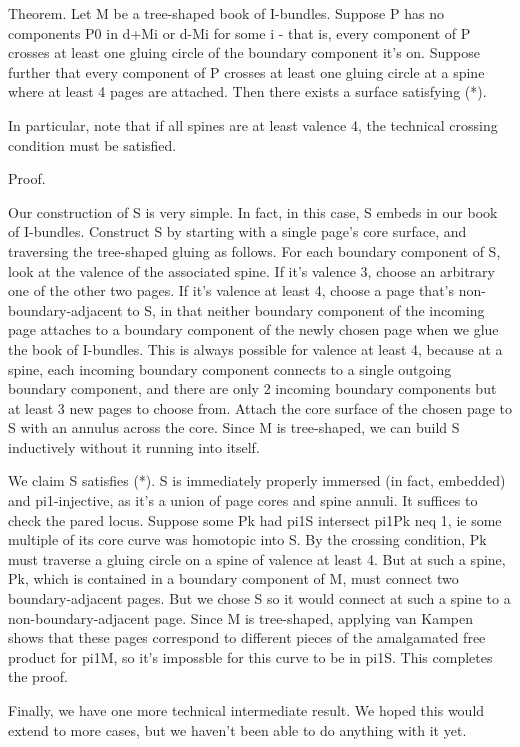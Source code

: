 \documentclass[12pt]{amsart}
\theoremstyle{definition}
\begin{document}
Theorem. Let M be a tree-shaped book of I-bundles. Suppose P has no components
P0 in d+Mi or d-Mi for some i - that is, every component of P crosses at least
one gluing circle of the boundary component it's on. Suppose further that every
component of P crosses at least one gluing circle at a spine where at least
4 pages are attached. Then there exists a surface satisfying (*).

In particular, note that if all spines are at least valence 4, the technical
crossing condition must be satisfied.

Proof.

Our construction of S is very simple. In fact, in this case, S embeds in our
book of I-bundles. Construct S by starting with a single page's core surface,
and traversing the tree-shaped gluing as follows. For each boundary component
of S, look at the valence of the associated spine. If it's valence 3, choose an
arbitrary one of the other two pages. If it's valence at least 4, choose a page
that's non-boundary-adjacent to S, in that neither boundary component of the
incoming page attaches to a boundary component of the newly chosen page when we
glue the book of I-bundles. This is always possible for valence at least 4,
because at a spine, each incoming boundary component connects to a single
outgoing boundary component, and there are only 2 incoming boundary components
but at least 3 new pages to choose from. Attach the core surface of the chosen
page to S with an annulus across the core. Since M is tree-shaped, we can build
S inductively without it running into itself.

We claim S satisfies (*). S is immediately properly immersed (in fact,
embedded) and pi1-injective, as it's a union of page cores and spine annuli. It
suffices to check the pared locus. Suppose some Pk had pi1S intersect pi1Pk neq
1, ie some multiple of its core curve was homotopic into S. By the crossing
condition, Pk must traverse a gluing circle on a spine of valence at least 4.
But at such a spine, Pk, which is contained in a boundary component of M, must
connect two boundary-adjacent pages. But we chose S so it would
connect at such a spine to a non-boundary-adjacent page. Since M is
tree-shaped, applying van Kampen shows that these pages correspond to
different pieces of the amalgamated free product for pi1M, so it's impossble
for this curve to be in pi1S. This completes the proof.

Finally, we have one more technical intermediate result. We hoped this would
extend to more cases, but we haven't been able to do anything with it yet.
\end{document}
